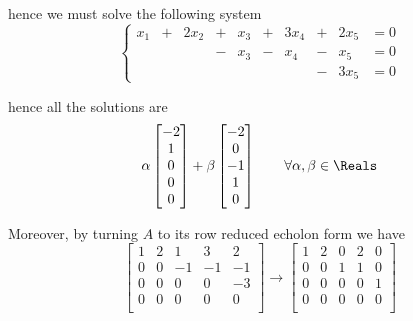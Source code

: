 \begin{example}
    hence we must solve the following system
    \begin{equation*}
        \left\{
        \begin{alignedat}{6}
            x_1 & +{} & 2x_2 & +{} & x_3 &+{} & 3x_4 &+{} & 2x_5 &= 0\\
            & {}  &{}    & -{} & x_3 &-{} & x_4  &-{} & x_5 &= 0\\
            & {}  &      & {}  &     &{}  &      &-{}  &3x_5 &= 0
        \end{alignedat}
        \right.
    \end{equation*}

    hence all the solutions are
    \begin{equation*}
        \alpha \begin{bmatrix}
            -2 \\
            1  \\
            0  \\
            0  \\
            0
        \end{bmatrix}
        + \beta \begin{bmatrix}
            -2 \\
            0  \\
            -1 \\
            1  \\
            0
        \end{bmatrix}
        \qquad \forall \alpha,\beta \in \Reals
    \end{equation*}

    Moreover, by turning \(A\) to its row reduced echolon form we have
    \begin{equation*}
        \begin{bmatrix}
            1 & 2 & 1  & 3  & 2  \\
            0 & 0 & -1 & -1 & -1 \\
            0 & 0 & 0  & 0  & -3 \\
            0 & 0 & 0  & 0  & 0  \\
        \end{bmatrix}  \rightarrow \begin{bmatrix}
            1 & 2 & 0 & 2 & 0 \\
            0 & 0 & 1 & 1 & 0 \\
            0 & 0 & 0 & 0 & 1 \\
            0 & 0 & 0 & 0 & 0 \\
        \end{bmatrix}
    \end{equation*}


\end{example}
